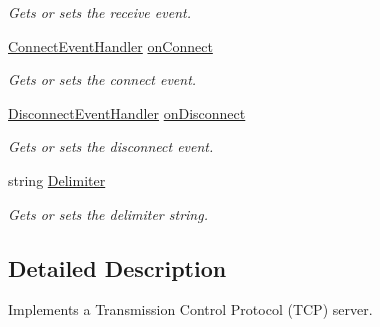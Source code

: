 \begin{DoxyCompactItemize}
\begin{DoxyCompactList}\small\item\em Gets or sets the receive event. \end{DoxyCompactList}\item 
\hypertarget{classAsterion_1_1Server_af4e72fa681e55ad7cc84a2d905792ffc}{\hyperlink{namespaceAsterion_a2a28db7d2f05f0681f449c943b3ae7bc}{Connect\-Event\-Handler} \hyperlink{classAsterion_1_1Server_af4e72fa681e55ad7cc84a2d905792ffc}{on\-Connect}}\label{classAsterion_1_1Server_af4e72fa681e55ad7cc84a2d905792ffc}

\begin{DoxyCompactList}\small\item\em Gets or sets the connect event. \end{DoxyCompactList}\item 
\hypertarget{classAsterion_1_1Server_aa576459e63badf871fcd88cdeb755f4b}{\hyperlink{namespaceAsterion_abd656f1ebffed3a17a1a0f809979f363}{Disconnect\-Event\-Handler} \hyperlink{classAsterion_1_1Server_aa576459e63badf871fcd88cdeb755f4b}{on\-Disconnect}}\label{classAsterion_1_1Server_aa576459e63badf871fcd88cdeb755f4b}

\begin{DoxyCompactList}\small\item\em Gets or sets the disconnect event. \end{DoxyCompactList}\item 
\hypertarget{classAsterion_1_1Server_a196c0514744f4e6a88ed5081d55709e7}{string \hyperlink{classAsterion_1_1Server_a196c0514744f4e6a88ed5081d55709e7}{Delimiter}}\label{classAsterion_1_1Server_a196c0514744f4e6a88ed5081d55709e7}

\begin{DoxyCompactList}\small\item\em Gets or sets the delimiter string. \end{DoxyCompactList}\end{DoxyCompactItemize}


\subsection{Detailed Description}
Implements a Transmission Control Protocol (T\-C\-P) server. 

